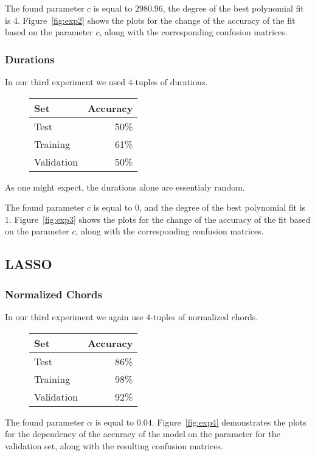\documentclass[twocolumn,dvipsnames]{article}
\begin{document}
The found parameter $c$ is equal to $2980.96$,
the degree of the best polynomial fit is 4. Figure~\ref{fig:exp2} shows the
plots for the change of the accuracy of the fit based on the parameter $c$,
along with the corresponding confusion matrices.

\subsubsection{Durations}
In our third experiment we used $4$-tuples of durations.
\begin{figure}[h!]
\centering
\begin{tabular}{lr}
\toprule
Set        & Accuracy \\
\midrule
Test       &    50\% \\
Training   &    61\% \\
Validation &    50\% \\
\bottomrule
\end{tabular}
\end{figure}

As one might expect, the durations alone are essentialy random.

The found parameter $c$ is equal to $0$,
and the degree of the best polynomial fit is 1.
Figure~\ref{fig:exp3} shows the plots for the change of the accuracy of the fit based on the parameter $c$, along with the corresponding confusion matrices.

\subsection{LASSO}
\subsubsection{Normalized Chords}
In our third experiment we again use $4$-tuples of normalized chords.
\begin{figure}[h!]
\centering
\begin{tabular}{lr}
\toprule
Set        & Accuracy \\
\midrule
Test       &     86\% \\
Training   &     98\% \\
Validation &     92\% \\
\bottomrule
\end{tabular}
\end{figure}

The found parameter $\alpha$ is equal to $0.04$.
Figure~\ref{fig:exp4} demonstrates the plots for the dependency of the accuracy of the model on the parameter for the validation set,
along with the resulting confusion matrices.
\end{document}
